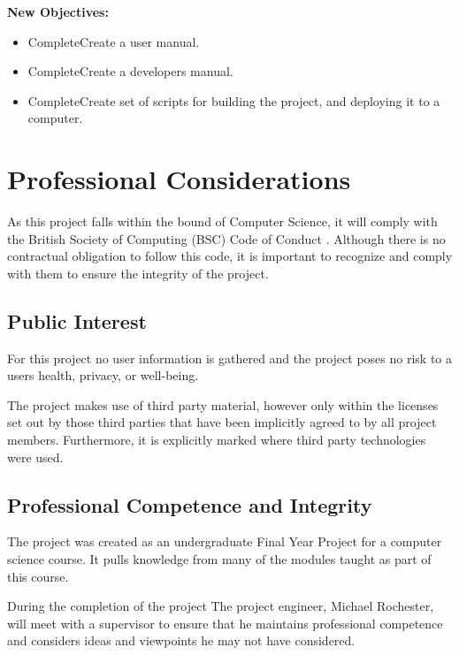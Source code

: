 \documentclass[a4paper]{report}
\begin{document}
\textbf {New Objectives:}


\begin{itemize}
\item \lbrack Complete\rbrack Create a user manual.
\item \lbrack Complete\rbrack Create a developers manual.
\item \lbrack Complete\rbrack Create set of scripts for building the project, and deploying it to a computer.
\end{itemize}















\chapter{Professional Considerations}

As this project falls within the bound of Computer Science, it will comply with the British Society of Computing (BSC) Code of Conduct \cite{CoC}. Although there is no contractual obligation to follow this code, it is important to recognize and comply with them to ensure the integrity of the project.

\section{Public Interest}

For this project no user information is gathered and the project poses no risk to a users health, privacy, or well-being.

The project makes use of third party material, however only within the licenses set out by those third parties that have been implicitly agreed to by all project members. Furthermore, it is explicitly marked where third party technologies were used.


\section{Professional Competence and Integrity}

The project was created as an undergraduate Final Year Project for a computer science course. It pulls knowledge from many of the modules taught as part of this course.

During the completion of the project The project engineer, Michael Rochester, will meet with a supervisor to ensure that he maintains professional competence and considers ideas and viewpoints he may not have considered.
\end{document}
